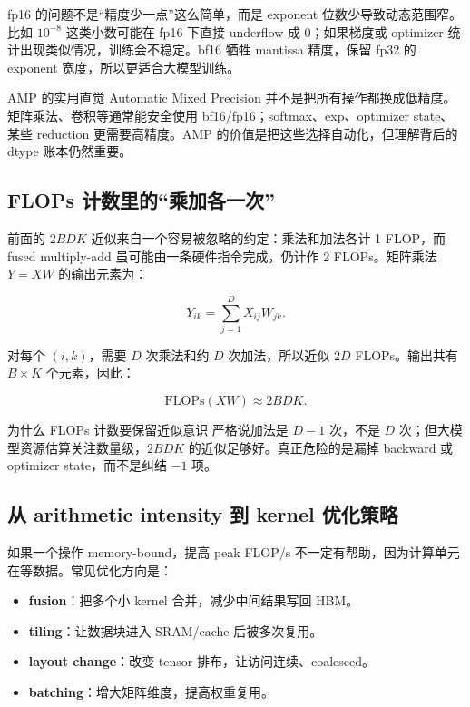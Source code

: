 fp16 的问题不是“精度少一点”这么简单，而是 exponent 位数少导致动态范围窄。比如 \(10^{-8}\) 这类小数可能在 fp16 下直接 underflow 成 0；如果梯度或 optimizer 统计出现类似情况，训练会不稳定。bf16 牺牲 mantissa 精度，保留 fp32 的 exponent 宽度，所以更适合大模型训练。

\begin{knowledgebox}{AMP 的实用直觉}
Automatic Mixed Precision 并不是把所有操作都换成低精度。矩阵乘法、卷积等通常能安全使用 bf16/fp16；softmax、exp、optimizer state、某些 reduction 更需要高精度。AMP 的价值是把这些选择自动化，但理解背后的 dtype 账本仍然重要。
\end{knowledgebox}

\subsection{FLOPs 计数里的“乘加各一次”}

前面的 $2BDK$ 近似来自一个容易被忽略的约定：乘法和加法各计 1 FLOP，而 fused multiply-add 虽可能由一条硬件指令完成，仍计作 2 FLOPs。矩阵乘法 \(Y=XW\) 的输出元素为：

\[
Y_{ik}=\sum_{j=1}^{D}X_{ij}W_{jk}.
\]

对每个 \((i,k)\)，需要 \(D\) 次乘法和约 \(D\) 次加法，所以近似 \(2D\) FLOPs。输出共有 \(B\times K\) 个元素，因此：

\[
\mathrm{FLOPs}(XW)\approx 2BDK.
\]

\begin{importantbox}{为什么 FLOPs 计数要保留近似意识}
严格说加法是 \(D-1\) 次，不是 \(D\) 次；但大模型资源估算关注数量级，\(2BDK\) 的近似足够好。真正危险的是漏掉 backward 或 optimizer state，而不是纠结 \(-1\) 项。
\end{importantbox}

\subsection{从 arithmetic intensity 到 kernel 优化策略}

如果一个操作 memory-bound，提高 peak FLOP/s 不一定有帮助，因为计算单元在等数据。常见优化方向是：

\begin{itemize}
    \item \textbf{fusion}：把多个小 kernel 合并，减少中间结果写回 HBM。
    \item \textbf{tiling}：让数据块进入 SRAM/cache 后被多次复用。
    \item \textbf{layout change}：改变 tensor 排布，让访问连续、coalesced。
    \item \textbf{batching}：增大矩阵维度，提高权重复用。
\end{itemize}

